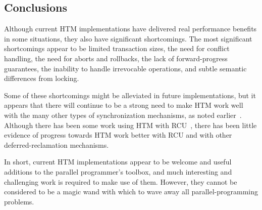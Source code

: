 \subsection{Conclusions}
\label{sec:future:Conclusions}

Although current HTM implementations have delivered real performance
benefits in some situations, they also have significant shortcomings.
The most significant shortcomings appear to be
limited transaction sizes,
the need for conflict handling, the need for aborts and rollbacks,
the lack of forward-progress guarantees,
the inability to handle irrevocable operations,
and subtle semantic differences
from locking.

Some of these shortcomings might be alleviated in future implementations,
but it appears that there will continue to be a strong need to make
HTM work well with the many other types of synchronization mechanisms,
as noted earlier~\cite{McKenney2007PLOSTM,PaulEMcKenney2010OSRGrassGreener}.
Although there has been some work using HTM with
RCU~\cite{Siakavaras2017CombiningHA,DimitriosSiakavaras2020RCU-HTM-B+Trees,ChristinaGiannoula2018HTM-RCU-graphcoloring,SeongJaePark2020HTMRCUlock},
there has been little evidence of progress towards HTM work better with
RCU and with other deferred-reclamation mechanisms.

In short, current HTM implementations appear to be welcome and useful
additions to the parallel programmer's toolbox, and much interesting
and challenging work is required to make use of them.
However, they cannot be
considered to be a magic wand with which to wave away all parallel-programming
problems.
